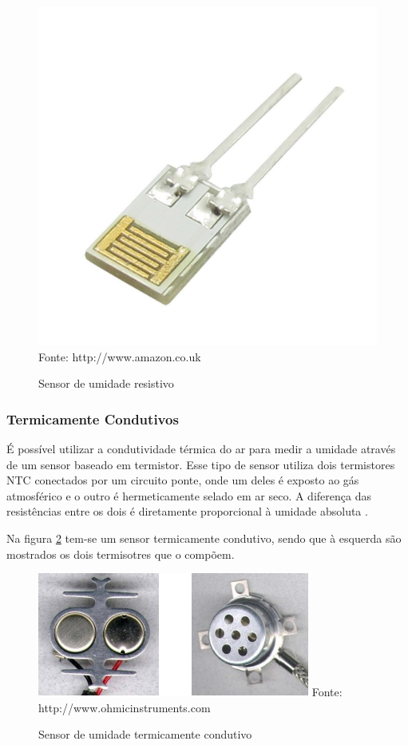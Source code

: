 \begin{figure}[h]
	\caption{Sensor de umidade resistivo}
	\centering
	\includegraphics[scale=0.18]{../images/resistive-humidity.jpg}
	\hspace{\linewidth}
	Fonte: http://www.amazon.co.uk
	\label{figura:resistive_humidity}
\end{figure}

\subsubsection{Termicamente Condutivos}
É possível utilizar a condutividade térmica do ar para medir a umidade através de um sensor baseado em
termistor. Esse tipo de sensor utiliza dois termistores NTC conectados por um circuito ponte, onde um deles é
exposto ao gás atmosférico e o outro é hermeticamente selado em ar seco. A diferença das resistências entre os
dois é diretamente proporcional à umidade absoluta \cite{fraden2010,fontesII2005}.

Na figura \ref{figura:thermal_conductivity_humidity} tem-se um sensor termicamente condutivo, sendo que à
esquerda são mostrados os dois termisotres que o compõem.

\begin{figure}[h]
	\caption{Sensor de umidade termicamente condutivo}
	\centering
	\includegraphics[scale=0.65]{../images/conductivity-humidity.jpg}
	\hspace{\linewidth}
	Fonte: http://www.ohmicinstruments.com
	\label{figura:thermal_conductivity_humidity}
\end{figure}

